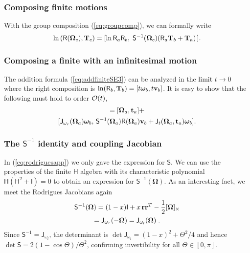 \documentclass[journal]{IEEEtran}
\newcommand{\bfomega}{\boldsymbol{\omega}}
\newcommand{\bfOmega}{\boldsymbol{\Omega}}
\newcommand{\beq}{\begin{equation}}
\newcommand{\eeq}{\end{equation}}
\begin{document}
\subsubsection{Composing finite motions}
With the group composition (\ref{eq:groupcomp}), we can formally write
\beq
    \ln \, (\mathsf{R}(\bfOmega_c),{\bf T}_c) = [\ln \mathsf{R}_a\mathsf{R}_b,\;
    \mathsf{S}^{-1}(\bfOmega_c) (\mathsf{R}_a{\bf T}_b + {\bf T}_a) \, ].
    \label{eq:addfiniteSE3}
\eeq

\subsubsection{Composing a finite with an infinitesimal motion}
The addition formula (\ref{eq:addfiniteSE3}) can be analyzed in the limit $t\rightarrow 0$ where the right composition is $\ln (\mathsf{R}_b,{\bf T}_b) = [t \bfomega_b, t {\bf v}_b]$. It is easy to show that the following must hold to order ${\cal O}(t)$,
\begin{multline}
    [\bfOmega_c,{\bf t}_c] = [\bfOmega_a,{\bf t}_a] + \\
    [\mathsf{J}_{\omega_r}(\bfOmega_a)\bfomega_b,\, 
    \mathsf{S}^{-1}(\bfOmega_a)\mathsf{R}(\bfOmega_a){\bf v}_b + \mathsf{J}_{t}(\bfOmega_a,{\bf t}_a)\bfomega_b].
    \label{eq:SE3vectoraddition}
\end{multline}

\subsubsection{The $\mathsf{S}^{-1}$ identity and coupling Jacobian}
In (\ref{eq:rodriguesapp}) we only gave the expression for $\mathsf{S}$. We can use the
properties of the finite $\mathsf{H}$ algebra with its characteristic polynomial $\mathsf{H}(\mathsf{H}^2+\mathsf{I})=0$
to obtain an expression for $\mathsf{S}^{-1}(\bfOmega)$. As an interesting fact, we meet the Rodrigues Jacobians again
\begin{multline}
    \mathsf{S}^{-1}(\bfOmega) = (1-x)\mathsf{I} + x\, {\bf r}{\bf r}^T - {1\over 2}[\bfOmega]_\times \\
    = \mathsf{J}_{\omega_r}(-\bfOmega) = \mathsf{J}_{\omega_l}(\bfOmega)\;.
    \label{eq:Sinvidentity}
\end{multline}
Since $\mathsf{S}^{-1} = \mathsf{J}_{\omega_l}$, the determinant is $\det\mathsf{J}_{\omega_l} = (1-x)^2 + \Theta^2/4$ and hence $\det\mathsf{S} = 2(1-\cos\Theta)/\Theta^2$, confirming invertibility for all $\Theta \in [0,\pi]$.
\end{document}
